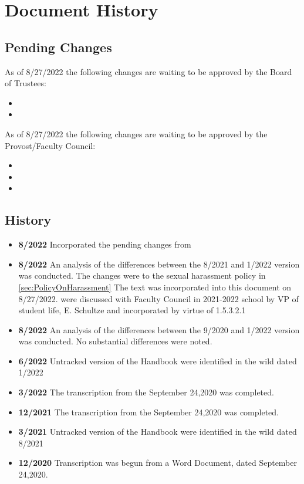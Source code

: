 \section{Document History}
	\subsection{Pending Changes}
		As of 8/27/2022 the following changes are waiting to be approved by the Board of Trustees:
		\begin{itemize}
			\item{}
			\item{}
		\end{itemize}

		As of 8/27/2022 the following changes are waiting to be approved by the Provost/Faculty Council:
		\begin{itemize}
			\item{}
			\item{}
			\item{}
		\end{itemize}


	\subsection{History}
		\begin{itemize}
			\item{{\bfseries 8/2022} Incorporated the pending changes from }
			\item{{\bfseries 8/2022} An analysis of the differences between the 8/2021 and 1/2022 version was conducted.
				The changes were to the sexual harassment policy in
				\ref{sec:PolicyOnHarassment}
				The text was incorporated into this document on 8/27/2022.
				were discussed with Faculty Council in 2021-2022 school by VP of student life, E. Schultze and incorporated by virtue of 1.5.3.2.1
			}
			\item{{\bfseries 8/2022} An analysis of the differences between the 9/2020 and 1/2022 version was conducted. No substantial differences were noted.}
			\item{{\bfseries 6/2022} Untracked version of the Handbook were identified in the wild dated 1/2022}
			\item{{\bfseries 3/2022} The transcription from the September 24,2020 was completed.}
			\item{{\bfseries 12/2021} The transcription from the September 24,2020 was completed.}
			\item{{\bfseries 3/2021} Untracked version of the Handbook were identified in the wild dated 8/2021}
			\item{{\bfseries 12/2020} Transcription was begun from a Word Document, dated September 24,2020.}
		\end{itemize}
